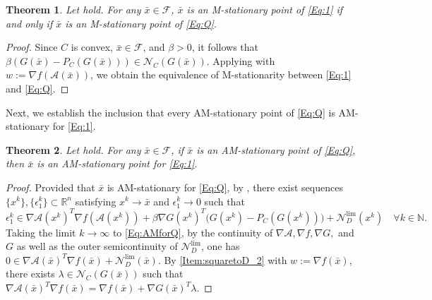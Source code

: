 \documentclass[11pt,a4paper,reqno]{amsart}
\newtheorem{theorem}{Theorem}[section]
\begin{document}
{\begin{theorem}\label{Th:EquilM}
      Let  hold. For any $\bar x\in \mathcal F $, $\bar x$ is an M-stationary point of \eqref{Eq:1} if and only if $\bar x$ is an M-stationary point of \eqref{Eq:Q}.
\end{theorem}
\begin{proof}
    Since $C$ is convex, $\bar x\in \mathcal F$, and $\beta>0$, it follows that $\beta (G(\bar x)-P_C(G(\bar x))) \in \mathcal N_C(G(\bar x))$. Applying  with $w:=\nabla f(\mathcal A(\bar x))$, we obtain the equivalence of M-stationarity between \eqref{Eq:1} and \eqref{Eq:Q}.
\end{proof}
  Next, we establish the inclusion that every AM-stationary point of \eqref{Eq:Q} is AM-stationary for \eqref{Eq:1}.%
  \begin{theorem}\label{Th:AM-statEquiv}
      Let  hold. For any $\bar x \in \mathcal F$, if $\bar x$ is an AM-stationary point of \eqref{Eq:Q}, then $\bar x$ is an AM-stationary point for \eqref{Eq:1}. 
  \end{theorem}
\begin{proof}
    Provided that $\bar x$ is AM-stationary for \eqref{Eq:Q}, by , there exist sequences $\{x^k\}, \{\epsilon_1^k\} \subset \mathbb R^n$ satisfying $x^k\to \bar x$ and $\epsilon_1^k \to 0$ such that
\begin{equation}\label{Eq:AMforQ}
    \epsilon_1^k\in\nabla \mathcal A(x^k)^T \nabla f(\mathcal A(x^k))+\beta \nabla G(x^k)^T\big(G(x^k)-P_C(G(x^k))\big)+\mathcal N_D^{\text{lim}}(x^k) \quad \forall k\in \mathbb N.
\end{equation}
Taking the limit $k\to \infty$ to \eqref{Eq:AMforQ}, by the continuity of $\nabla \mathcal A, \nabla f, \nabla G,$ and $G$ as well as the outer semicontinuity of $\mathcal N_D^{\text{lim}}$, one has
    $0\in \nabla \mathcal A(\bar x)^T \nabla f(\bar x)+\mathcal N_D^{\text{lim}}(\bar x)$.
By \eqref{Item:squaretoD_2} with $w:=\nabla f(\bar x)$, there exists $\lambda \in \mathcal N_C(G(\bar x))$ such that
$\nabla \mathcal A(\bar x)^T \nabla f(\bar x) = \nabla f(\bar x) +\nabla G(\bar x)^T\lambda$.


\end{proof}}
\end{document}
